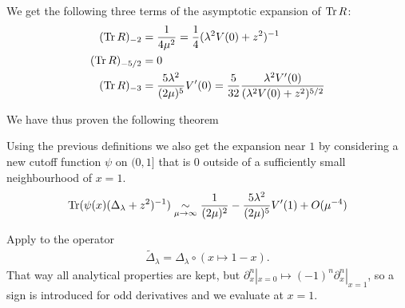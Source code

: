 We get the following three terms of the asymptotic expansion of $\operatorname{Tr} R$:
\begin{align}
  (\operatorname{Tr} R)_{-2} &= \frac{1}{4\mu^2} = \frac{1}{4} (\lambda^2V(0) + z^2)^{-1} \\
  (\operatorname{Tr} R)_{-5/2} &= 0 \\
    (\operatorname{Tr} R)_{-3} &= \frac{5\lambda^2}{(2\mu)^5} V'(0) =
  \frac{5}{32}\frac{\lambda^2 V'(0)}{(\lambda^2 V(0) + z^2)^{5/2}}
\end{align}

We have thus proven the following theorem
\begin{MainTheorem}
  \label{main:boundary}
  
  \begin{Corollary}
    \label{cor:boundary}
    Using the previous definitions we also get the expansion near $1$ by
    considering a new cutoff function $\psi$ on $(0,1]$ that is $0$ outside of a
    sufficiently small neighbourhood of $x=1$.
    \begin{align*}
      \operatorname{Tr}(\psi(x)(\Delta_\lambda + z^2)^{-1}) \mathrel{\underset{\mu\to\infty}{\sim}}
      \frac{1}{(2\mu)^2} - \frac{5\lambda^2}{(2\mu)^5} V'(1) + O(\mu^{-4})
    \end{align*}
    \begin{Proof}
      Apply  to the operator
      \begin{align*}
        \tilde\Delta_\lambda = \Delta_\lambda\circ(x\mapsto 1-x).
      \end{align*}
      That way all analytical properties are kept, but $\partial_x^n|_{x=0}
      \mapsto (-1)^n \partial_x^n|_{x=1}$, so a sign is introduced for odd
      derivatives and we evaluate at $x=1$.
    \end{Proof}
  \end{Corollary}
\end{MainTheorem}

